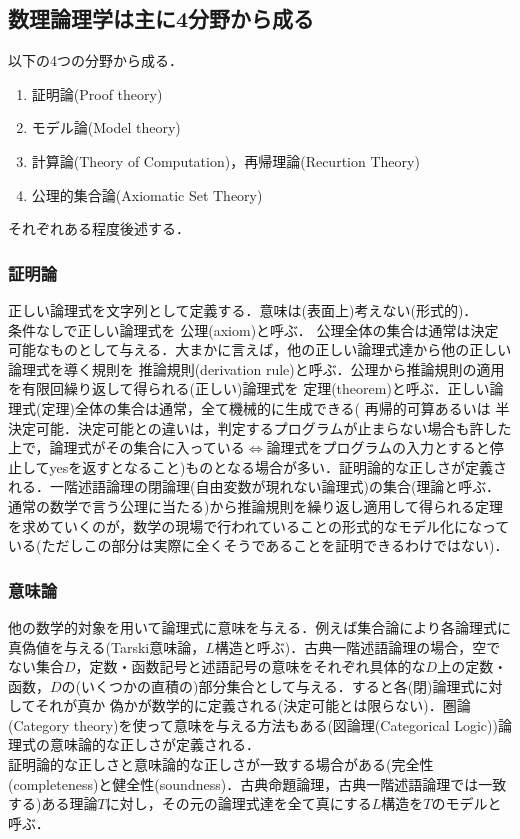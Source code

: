 \documentclass{ltjsarticle}
\theoremstyle{mystyle1}
\theoremstyle{mystyle2}
\newcommand{\red}[1]{{\color{red} #1}}
\begin{document}
\subsection{数理論理学は主に4分野から成る}
以下の4つの分野から成る．
\begin{enumerate}
  \item 証明論(Proof theory)
  \item モデル論(Model theory)
  \item 計算論(Theory of Computation)，再帰理論(Recurtion Theory)
  \item 公理的集合論(Axiomatic Set Theory)
\end{enumerate}
それぞれある程度後述する．
\subsubsection{証明論}
正しい論理式を文字列として定義する．意味は(表面上)考えない(形式的)．\\
条件なしで正しい論理式を\red{公理}(axiom)と呼ぶ． 公理全体の集合は通常は決定可能なものとして与える．大まかに言えば，他の正しい論理式達から他の正しい論理式を導く規則を\red{推論規則}(derivation rule)と呼ぶ．公理から推論規則の適用を有限回繰り返して得られる(正しい)論理式を\red{定理}(theorem)と呼ぶ．正しい論理式(定理)全体の集合は通常，全て機械的に生成できる(\red{再帰的可算}あるいは\red{半決定可能}．決定可能との違いは，判定するプログラムが止まらない場合も許した上で，論理式がその集合に入っている$\Leftrightarrow$論理式をプログラムの入力とすると停止してyesを返すとなること)ものとなる場合が多い．証明論的な正しさが定義される．一階述語論理の閉論理(自由変数が現れない論理式)の集合(理論と呼ぶ．通常の数学で言う公理に当たる)から推論規則を繰り返し適用して得られる定理を求めていくのが，数学の現場で行われていることの形式的なモデル化になっている(ただしこの部分は実際に全くそうであることを証明できるわけではない)．
\subsubsection{意味論}
他の数学的対象を用いて論理式に意味を与える．例えば集合論により各論理式に真偽値を与える(Tarski意味論，$L$構造と呼ぶ)．古典一階述語論理の場合，空でない集合$D$，定数・函数記号と述語記号の意味をそれぞれ具体的な$D$上の定数・函数，$D$の(いくつかの直積の)部分集合として与える．すると各(閉)論理式に対してそれが真か 偽かが数学的に定義される(決定可能とは限らない)．圏論(Category theory)を使って意味を与える方法もある(図論理(Categorical Logic))論理式の意味論的な正しさが定義される．\\
証明論的な正しさと意味論的な正しさが一致する場合がある(完全性(completeness)と健全性(soundness)．古典命題論理，古典一階述語論理では一致する)ある理論$T$に対し，その元の論理式達を全て真にする$L$構造を$T$のモデルと呼ぶ．
\end{document}
